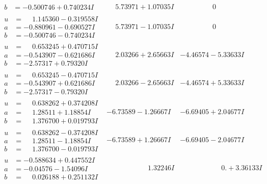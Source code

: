 \documentclass[1p]{elsarticle_modified}
\theoremstyle{definition}
\begin{document}
$$\begin{array}{c|c|c}
\begin{aligned}
b &= -0.500746 + 0.740234 I\end{aligned}
 & \phantom{-}5.73971 + 1.07035 I & \phantom{-0.000000 } 0 \\ \hline\begin{aligned}
u &= \phantom{-}1.145360 - 0.319558 I \\
a &= -0.880961 - 0.690527 I \\
b &= -0.500746 - 0.740234 I\end{aligned}
 & \phantom{-}5.73971 - 1.07035 I & \phantom{-0.000000 } 0 \\ \hline\begin{aligned}
u &= \phantom{-}0.653245 + 0.470715 I \\
a &= -0.543907 - 0.621686 I \\
b &= -2.57317 + 0.79320 I\end{aligned}
 & \phantom{-}2.03266 + 2.65663 I & -4.46574 - 5.33633 I \\ \hline\begin{aligned}
u &= \phantom{-}0.653245 - 0.470715 I \\
a &= -0.543907 + 0.621686 I \\
b &= -2.57317 - 0.79320 I\end{aligned}
 & \phantom{-}2.03266 - 2.65663 I & -4.46574 + 5.33633 I \\ \hline\begin{aligned}
u &= \phantom{-}0.638262 + 0.374208 I \\
a &= \phantom{-}1.28511 + 1.18854 I \\
b &= \phantom{-}1.376700 + 0.019793 I\end{aligned}
 & -6.73589 - 1.26667 I & -6.69405 + 2.04677 I \\ \hline\begin{aligned}
u &= \phantom{-}0.638262 - 0.374208 I \\
a &= \phantom{-}1.28511 - 1.18854 I \\
b &= \phantom{-}1.376700 - 0.019793 I\end{aligned}
 & -6.73589 + 1.26667 I & -6.69405 - 2.04677 I \\ \hline\begin{aligned}
u &= -0.588634 + 0.447552 I \\
a &= -0.04576 - 1.54096 I \\
b &= \phantom{-}0.026188 + 0.251132 I\end{aligned}
 & \phantom{-0.000000 -}1.32246 I & \phantom{-0.000000 -}0. + 3.36133 I \\ \hline\begin{aligned}

\end{aligned}
\end{array}$$
\end{document}
